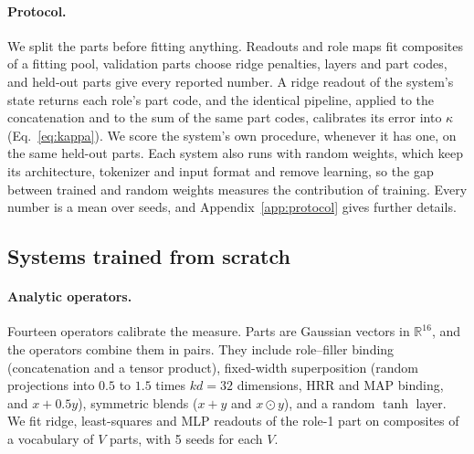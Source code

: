 \documentclass[10pt]{article}
\theoremstyle{plain}
\theoremstyle{remark}
\newcommand{\R}{\mathbb{R}}
\begin{document}
\paragraph{Protocol.} We split the parts before fitting anything. Readouts and role maps fit composites of a fitting pool, validation parts choose ridge penalties, layers and part codes, and held-out parts give every reported number. A ridge readout of the system's state returns each role's part code, and the identical pipeline, applied to the concatenation and to the sum of the same part codes, calibrates its error into $\kappa$ (Eq.~\ref{eq:kappa}). We score the system's own procedure, whenever it has one, on the same held-out parts. Each system also runs with random weights, which keep its architecture, tokenizer and input format and remove learning, so the gap between trained and random weights measures the contribution of training. Every number is a mean over seeds, and Appendix~\ref{app:protocol} gives further details.

\subsection{Systems trained from scratch}
\label{sec:design_scratch}

\paragraph{Analytic operators.} Fourteen operators calibrate the measure. Parts are Gaussian vectors in $\R^{16}$, and the operators combine them in pairs. They include role--filler binding (concatenation and a tensor product), fixed-width superposition (random projections into $0.5$ to $1.5$ times $kd = 32$ dimensions, HRR and MAP binding, and $x + 0.5y$), symmetric blends ($x + y$ and $x \odot y$), and a random $\tanh$ layer. We fit ridge, least-squares and MLP readouts of the role-1 part on composites of a vocabulary of $V$ parts, with 5 seeds for each $V$.
\end{document}
